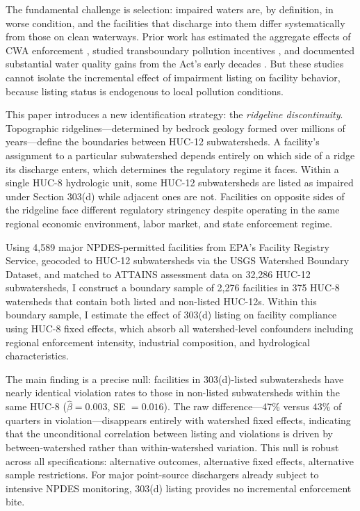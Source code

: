 \documentclass[12pt]{article}
\begin{document}
The fundamental challenge is selection: impaired waters are, by definition, in worse condition, and the facilities that discharge into them differ systematically from those on clean waterways. Prior work has estimated the aggregate effects of CWA enforcement \citep{keiser2019consequences, greenstone2012does}, studied transboundary pollution incentives \citep{sigman2005transboundary, lipscomb2012crossing}, and documented substantial water quality gains from the Act's early decades \citep{keiser2019us}. But these studies cannot isolate the incremental effect of impairment listing on facility behavior, because listing status is endogenous to local pollution conditions.

This paper introduces a new identification strategy: the \textit{ridgeline discontinuity}. Topographic ridgelines---determined by bedrock geology formed over millions of years---define the boundaries between HUC-12 subwatersheds. A facility's assignment to a particular subwatershed depends entirely on which side of a ridge its discharge enters, which determines the regulatory regime it faces. Within a single HUC-8 hydrologic unit, some HUC-12 subwatersheds are listed as impaired under Section 303(d) while adjacent ones are not. Facilities on opposite sides of the ridgeline face different regulatory stringency despite operating in the same regional economic environment, labor market, and state enforcement regime.

Using 4,589 major NPDES-permitted facilities from EPA's Facility Registry Service, geocoded to HUC-12 subwatersheds via the USGS Watershed Boundary Dataset, and matched to ATTAINS assessment data on 32,286 HUC-12 subwatersheds, I construct a boundary sample of 2,276 facilities in 375 HUC-8 watersheds that contain both listed and non-listed HUC-12s. Within this boundary sample, I estimate the effect of 303(d) listing on facility compliance using HUC-8 fixed effects, which absorb all watershed-level confounders including regional enforcement intensity, industrial composition, and hydrological characteristics.

The main finding is a precise null: facilities in 303(d)-listed subwatersheds have nearly identical violation rates to those in non-listed subwatersheds within the same HUC-8 ($\hat{\beta} = 0.003$, SE $= 0.016$). The raw difference---47\% versus 43\% of quarters in violation---disappears entirely with watershed fixed effects, indicating that the unconditional correlation between listing and violations is driven by between-watershed rather than within-watershed variation. This null is robust across all specifications: alternative outcomes, alternative fixed effects, alternative sample restrictions. For major point-source dischargers already subject to intensive NPDES monitoring, 303(d) listing provides no incremental enforcement bite.
\end{document}
